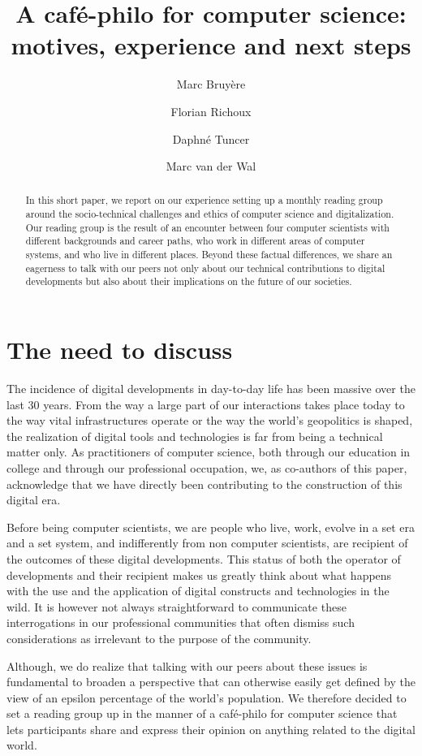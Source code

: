 \documentclass[journal]{IEEEtran}
\title{A café-philo for computer science:\\motives, experience and next steps}
\date{}
\author[1,3]{Marc Bruyère}
\author[2,3]{Florian Richoux}
\author[4]{Daphné Tuncer}
\author[5]{Marc van der Wal}
\affil[ ]{\it florian@richoux.fr}
\affil[1]{IIJ Research Lab, Japan}
\affil[2]{AIST, Japan}
\affil[3]{JFLI, CNRS, Japan}
\affil[4]{École des Ponts ParisTech, France}
\affil[5]{Afnic, France}
\begin{document}
\maketitle

\begin{abstract}
  In  this short  paper,  we report  on our  experience  setting up  a
  monthly  reading group  around  the  socio-technical challenges  and
  ethics of computer science and  digitalization. Our reading group is
  the result  of an  encounter between  four computer  scientists with
  different backgrounds and career paths,  who work in different areas
  of computer systems, and who  live in different places. Beyond these
  factual differences,  we share an  eagerness to talk with  our peers
  not only  about our technical contributions  to digital developments
  but also about their implications on the future of our societies.
\end{abstract}

\section{The need to discuss}

The  incidence of  digital developments  in day-to-day  life has  been
massive over  the last  30 years.  From the  way a  large part  of our
interactions  takes  place  today  to the  way  vital  infrastructures
operate or the way the  world’s geopolitics is shaped, the realization
of digital tools and technologies is far from being a technical matter
only. As practitioners of computer science, both through our education
in college and through our  professional occupation, we, as co-authors
of this paper, acknowledge that  we have directly been contributing to
the construction of this digital era.

Before being computer scientists, we are people who live, work, evolve
in a  set era and  a set system,  and indifferently from  non computer
scientists,   are  recipient   of  the   outcomes  of   these  digital
developments. This  status of  both the  operator of  developments and
their recipient makes us greatly think about what happens with the use
and  the application  of digital  constructs and  technologies in  the
wild. It  is however not  always straightforward to  communicate these
interrogations in our professional communities that often dismiss such
considerations as irrelevant to the purpose of the community.

Although, we do realize that talking with our peers about these issues
is fundamental to broaden a  perspective that can otherwise easily get
defined  by  the  view  of   an  epsilon  percentage  of  the  world’s
population. We  therefore decided  to set  a reading  group up  in the
manner of  a café-philo  for computer  science that  lets participants
share and  express their  opinion on anything  related to  the digital
world.
\end{document}
